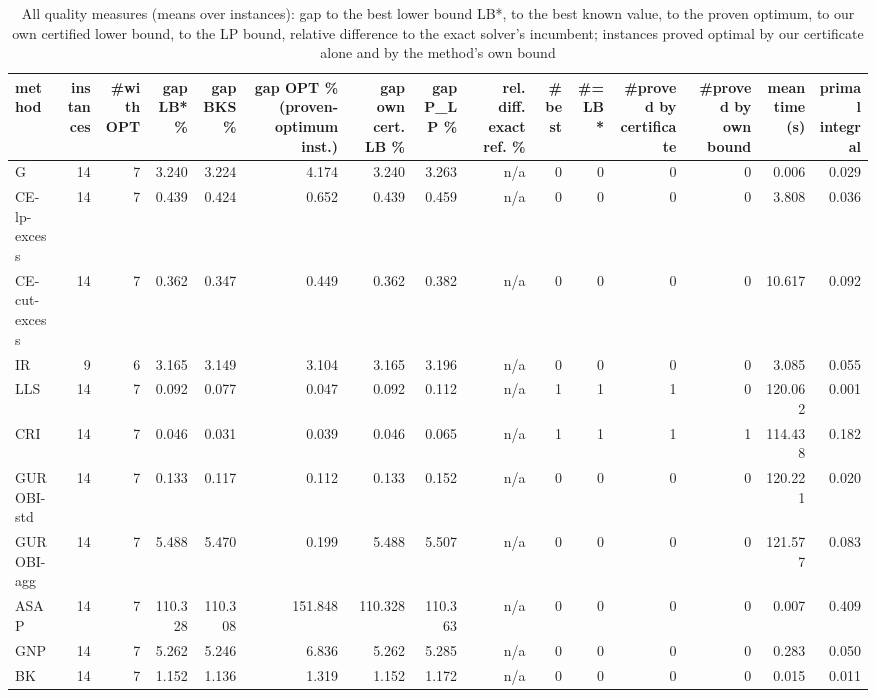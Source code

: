 \begin{table}[htbp]
\centering
\small
\caption{All quality measures (means over instances): gap to the best lower bound LB*, to the best known value, to the proven optimum, to our own certified lower bound, to the LP bound, relative difference to the exact solver's incumbent; instances proved optimal by our certificate alone and by the method's own bound}
\label{tab:E6_scalability_b120_all_metrics}
\begin{tabular}{lrrrrrrrrrrrrrr}
\toprule
method & instances & \#with OPT & gap LB* \% & gap BKS \% & gap OPT \% (proven-optimum inst.) & gap own cert. LB \% & gap P\_LP \% & rel. diff. exact ref. \% & \#best & \#= LB* & \#proved by certificate & \#proved by own bound & mean time (s) & primal integral \\
\midrule
G & 14 & 7 & 3.240 & 3.224 & 4.174 & 3.240 & 3.263 & n/a & 0 & 0 & 0 & 0 & 0.006 & 0.029 \\
CE-lp-excess & 14 & 7 & 0.439 & 0.424 & 0.652 & 0.439 & 0.459 & n/a & 0 & 0 & 0 & 0 & 3.808 & 0.036 \\
CE-cut-excess & 14 & 7 & 0.362 & 0.347 & 0.449 & 0.362 & 0.382 & n/a & 0 & 0 & 0 & 0 & 10.617 & 0.092 \\
IR & 9 & 6 & 3.165 & 3.149 & 3.104 & 3.165 & 3.196 & n/a & 0 & 0 & 0 & 0 & 3.085 & 0.055 \\
LLS & 14 & 7 & 0.092 & 0.077 & 0.047 & 0.092 & 0.112 & n/a & 1 & 1 & 1 & 0 & 120.062 & 0.001 \\
CRI & 14 & 7 & 0.046 & 0.031 & 0.039 & 0.046 & 0.065 & n/a & 1 & 1 & 1 & 1 & 114.438 & 0.182 \\
GUROBI-std & 14 & 7 & 0.133 & 0.117 & 0.112 & 0.133 & 0.152 & n/a & 0 & 0 & 0 & 0 & 120.221 & 0.020 \\
GUROBI-agg & 14 & 7 & 5.488 & 5.470 & 0.199 & 5.488 & 5.507 & n/a & 0 & 0 & 0 & 0 & 121.577 & 0.083 \\
ASAP & 14 & 7 & 110.328 & 110.308 & 151.848 & 110.328 & 110.363 & n/a & 0 & 0 & 0 & 0 & 0.007 & 0.409 \\
GNP & 14 & 7 & 5.262 & 5.246 & 6.836 & 5.262 & 5.285 & n/a & 0 & 0 & 0 & 0 & 0.283 & 0.050 \\
BK & 14 & 7 & 1.152 & 1.136 & 1.319 & 1.152 & 1.172 & n/a & 0 & 0 & 0 & 0 & 0.015 & 0.011 \\
\bottomrule
\end{tabular}
\end{table}
